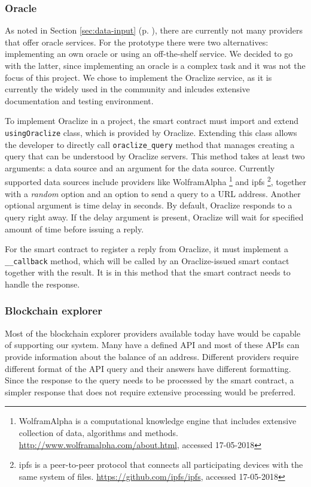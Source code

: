 \subsubsection{Oracle}
As noted in Section \ref{sec:data-input} (p. \pageref{sec:data-input}), there are currently not many providers that offer oracle services. For the prototype there were two alternatives: implementing an own oracle or using an off-the-shelf service. We decided to go with the latter, since implementing an oracle is a complex task and it was not the focus of this project. We chose to implement the Oraclize service, as it is currently the widely used in the community and inlcudes extensive documentation and testing environment.

To implement Oraclize in a project, the smart contract must import and extend \texttt{usingOraclize} class, which is provided by Oraclize. Extending this class allows the developer to directly call \texttt{oraclize\_query} method that manages creating a query that can be understood by Oraclize servers. This method takes at least two arguments: a data source and an argument for the data source. Currently supported data sources include providers like WolframAlpha%
\footnote{WolframAlpha is a computational knowledge engine that includes extensive collection of data, algorithms and methods. \url{http://www.wolframalpha.com/about.html}, accessed 17-05-2018}%
and \acrshort{ipfs}%
\footnote{\acrfull{ipfs} is a peer-to-peer protocol that connects all participating devices with the same system of files. \url{https://github.com/ipfs/ipfs}, accessed 17-05-2018},%
together with a \textit{random} option and an option to send a query to a URL address. Another optional argument is time delay in seconds. By default, Oraclize responds to a query right away. If the delay argument is present, Oraclize will wait for specified amount of time before issuing a reply.

For the smart contract to register a reply from Oraclize, it must implement a \texttt{\_\_callback} method, which will be called by an Oraclize-issued smart contact together with the result. It is in this method that the smart contract needs to handle the response.
%
% 
% 
\subsubsection{Blockchain explorer}
Most of the blockchain explorer providers available today have would be capable of supporting our system. Many have a defined API and most of these APIs can provide information about the balance of an address. Different providers require different format of the API query and their answers have different formatting. Since the response to the query needs to be processed by the smart contract, a simpler response that does not require extensive processing would be preferred.

